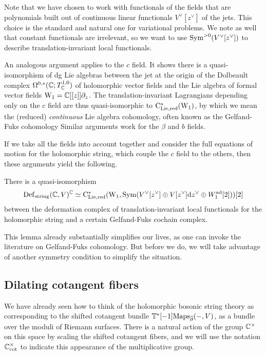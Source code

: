 Note that we have chosen to work with functionals of the fields
that are polynomials built out of continuous linear functionals $V^\vee[z^\vee]$ of the jets.
This choice is the standard and natural one for variational problems.
We note as well that constant functionals are irrelevant,
so we want to use ${\rm Sym}^{>0}(V^\vee[z^\vee])$ to describe translation-invariant local functionals.

An analogous argument applies to the $c$ field. 
It shows there is a quasi-isomorphism of dg Lie algebras 
between the jet at the origin of the Dolbeault complex $\Omega^{0,*}(\mathbb C ; T^{1,0}_\mathbb C)$ of holomorphic vector fields 
and the Lie algebra of formal vector fields ${\rm W}_1 = \mathbb C[[z]]\partial_z$.
The translation-invariant Lagrangians depending only on the $c$ field 
are thus quasi-isomorphic to ${\rm C}_{\rm Lie,red}^*({\rm W}_1)$,
by which we mean the (reduced) {\em continuous} Lie algebra cohomology,
often known as the Gelfand-Fuks cohomology 
Similar arguments work for the $\beta$ and $b$ fields.

If we take all the fields into account together and consider the full equations of motion 
for the holomorphic string,
which couple the $c$ field to the others,
then these arguments yield the following.

\begin{lem}\label{lem: gf1}
There is a quasi-isomorphism 
\[
{\rm Def}_{\rm string}(\mathbb C,V)^\mathbb C \simeq {\rm C}_{\rm Lie,red}^*({\rm W}_1, {\rm Sym}(V^\vee[z^\vee] \oplus V[z^\vee] {\rm d} z^\vee \oplus W_1^{\rm ad}[2])) [2]
\]
between the deformation complex of translation-invariant local functionals for the holomorphic string and a certain Gelfand-Fuks cochain complex.
\end{lem}

This lemma already substantially simplifies our lives, 
as one can invoke the literature on Gelfand-Fuks cohomology.
But before we do,
we will take advantage of another symmetry condition to simplify the situation.

\subsection{Dilating cotangent fibers}

We have already seen how to think of the holomorphic bosonic string theory 
as corresponding to the shifted cotangent bundle $\mathbb T^*[-1]{\rm Maps}_{\overline{\partial}}(-, V)$, 
as a bundle over the moduli of Riemann surfaces. 
There is a natural action of the group $ \mathbb C^\times$ on this space
by scaling the shifted cotangent fibers,
and we will use the notation $\mathbb C^\times_{\rm cot}$ to indicate this appearance of the multiplicative group.

